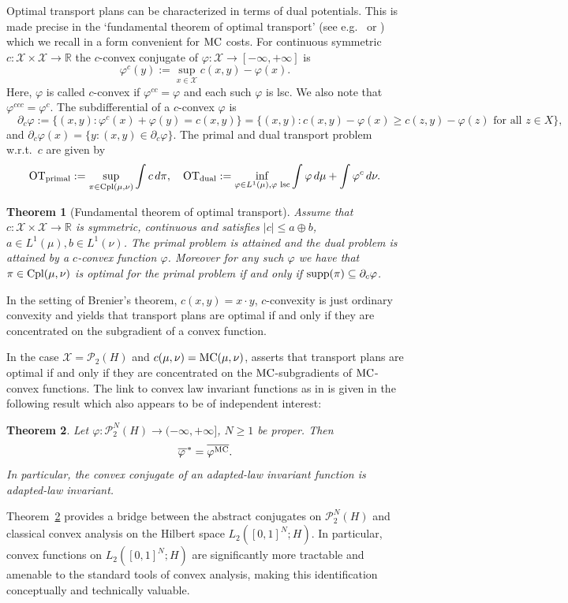 \documentclass[a4paper]{amsart}
\newtheorem{theorem}{Theorem}
\numberwithin{theorem}{section}
\theoremstyle{definition}
\newcommand{\R}{\mathbb{R}}
\newcommand{\X}{\mathcal{X}}
\newcommand{\Xs}{\mathcal X}
\newcommand{\supp}{\textup{supp}}
\newcommand{\cpl}{\textup{Cpl}}
\newcommand{\Pc}{\mathcal P}
\renewcommand{\H}{H}
\renewcommand{\phi}{\varphi}
\newcommand{\mc}{\textup{MC}}
\newcommand{\MC}{\textup{MC}}
\begin{document}
Optimal transport plans can be characterized in terms of dual potentials. This is made precise in the  
`fundamental theorem of optimal transport' (see e.g.\ \cite{AmGiSa08} or \cite{Vi09}) which we recall in a form convenient for $\MC$ costs.
For continuous symmetric $c:\Xs\times \Xs\to \R$
the $c$-convex conjugate of $\phi:\Xs\to [-\infty, +\infty]$ is %
$$ \phi^c (y):=\sup_{x\in \Xs} c(x,y)-\phi(x).$$ 
Here, $\phi$ is called $c$-convex 
if $\phi^{cc} = \phi$ and each such $\phi$ is lsc. We also note that $\phi^{ccc}= \phi^c$.  
The subdifferential of a $c$-convex $\phi$ is $$\quad \partial_c \phi:=\{(x,y): \phi^c (x) + \phi(y)=c(x,y)\} = \{(x,y): c(x,y)- \phi(x) \geq c(z,y) - \phi(z) \text{ for all $z\in X$} \},$$
and  $\partial_c \phi(x)=\{y:(x,y)\in \partial_c \phi\}$.
The primal and dual transport problem w.r.t.\ $c$ are given by 
\begin{align}\label{eq:OTmaxversion}\text{OT}_{\text{primal}}:=\sup_{\pi \in\cpl(\mu, \nu) } \int c\, d\pi, \quad \text{OT}_{\text{dual}}:= \inf_{\phi\in L^1 (\mu), \phi \text{ lsc}} \int \phi \, d\mu + \int \phi^c \, d\nu.\end{align}
\begin{theorem}[Fundamental theorem of optimal transport] \label{thm:ftot}
    Assume that $c:\Xs\times \Xs\to \R$ is symmetric, continuous and satisfies $|c|\leq a\oplus b$, $a\in L^1 (\mu),b\in L^1(\nu)$. 
The  primal problem is attained and the dual problem is attained by a $c$-convex function $\phi$. Moreover for any such $\phi$ we have that $\pi \in \cpl(\mu, \nu)$ is optimal for the primal problem if and only if $\supp (\pi) \subseteq \partial_c \phi$.
\end{theorem}

In the setting of Brenier's theorem, $c(x, y)= x \cdot y$, $c$-convexity is just ordinary convexity and  yields that transport plans are optimal if and only if they are concentrated on the subgradient of a convex function. 

In the case
$\X= \Pc_2(H)$ and $c(\mu, \nu)= \MC(\mu, \nu)$,  asserts that transport plans are optimal if and only if they are concentrated on the $\MC$-subgradients of $\MC$-convex functions. 
The link to convex law invariant functions as in  is given in the following result which also appears to be of independent interest: 
\begin{theorem}\label{thm:MCiConvConjIntro}
Let $\phi : \Pc_2^N(\H) \to (-\infty, +\infty]$, $N\geq 1$ be proper. Then
\[
{\overline{\phi\,}}^\ast = \overline{\phi^{\mc}}.
\]
In particular, the convex conjugate of an adapted-law invariant function is adapted-law invariant.
\end{theorem}
Theorem~\ref{thm:MCiConvConjIntro} provides a bridge between 
the abstract conjugates on  $\Pc^N_2(H)$ and classical convex analysis on the Hilbert space 
$L_2([0,1]^N;H)$. In particular, convex functions on $L_2([0,1]^N;H)$ are significantly more tractable 
and amenable to the standard tools of convex analysis, making this identification conceptually 
and technically valuable. 
\end{document}
